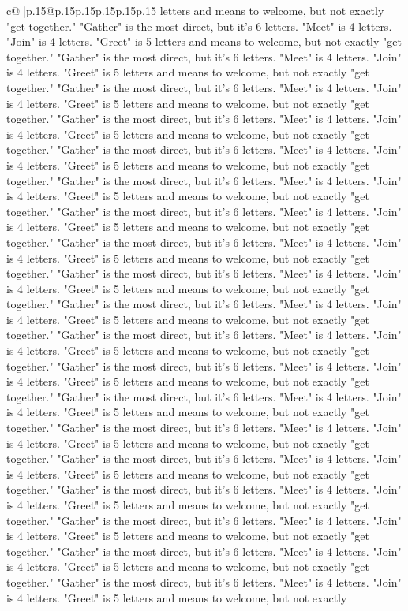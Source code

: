 \documentclass{article}
\begin{document}
{\begin{supertabular}{c@{$\;$}|p{.15\linewidth}@{}p{.15\linewidth}p{.15\linewidth}p{.15\linewidth}p{.15\linewidth}p{.15\linewidth}}
{{{letters and means to welcome, but not exactly "get together." "Gather" is the most direct, but it's 6 letters. "Meet" is 4 letters. "Join" is 4 letters. "Greet" is 5 letters and means to welcome, but not exactly "get together." "Gather" is the most direct, but it's 6 letters. "Meet" is 4 letters. "Join" is 4 letters. "Greet" is 5 letters and means to welcome, but not exactly "get together." "Gather" is the most direct, but it's 6 letters. "Meet" is 4 letters. "Join" is 4 letters. "Greet" is 5 letters and means to welcome, but not exactly "get together." "Gather" is the most direct, but it's 6 letters. "Meet" is 4 letters. "Join" is 4 letters. "Greet" is 5 letters and means to welcome, but not exactly "get together." "Gather" is the most direct, but it's 6 letters. "Meet" is 4 letters. "Join" is 4 letters. "Greet" is 5 letters and means to welcome, but not exactly "get together." "Gather" is the most direct, but it's 6 letters. "Meet" is 4 letters. "Join" is 4 letters. "Greet" is 5 letters and means to welcome, but not exactly "get together." "Gather" is the most direct, but it's 6 letters. "Meet" is 4 letters. "Join" is 4 letters. "Greet" is 5 letters and means to welcome, but not exactly "get together." "Gather" is the most direct, but it's 6 letters. "Meet" is 4 letters. "Join" is 4 letters. "Greet" is 5 letters and means to welcome, but not exactly "get together." "Gather" is the most direct, but it's 6 letters. "Meet" is 4 letters. "Join" is 4 letters. "Greet" is 5 letters and means to welcome, but not exactly "get together." "Gather" is the most direct, but it's 6 letters. "Meet" is 4 letters. "Join" is 4 letters. "Greet" is 5 letters and means to welcome, but not exactly "get together." "Gather" is the most direct, but it's 6 letters. "Meet" is 4 letters. "Join" is 4 letters. "Greet" is 5 letters and means to welcome, but not exactly "get together." "Gather" is the most direct, but it's 6 letters. "Meet" is 4 letters. "Join" is 4 letters. "Greet" is 5 letters and means to welcome, but not exactly "get together." "Gather" is the most direct, but it's 6 letters. "Meet" is 4 letters. "Join" is 4 letters. "Greet" is 5 letters and means to welcome, but not exactly "get together." "Gather" is the most direct, but it's 6 letters. "Meet" is 4 letters. "Join" is 4 letters. "Greet" is 5 letters and means to welcome, but not exactly "get together." "Gather" is the most direct, but it's 6 letters. "Meet" is 4 letters. "Join" is 4 letters. "Greet" is 5 letters and means to welcome, but not exactly "get together." "Gather" is the most direct, but it's 6 letters. "Meet" is 4 letters. "Join" is 4 letters. "Greet" is 5 letters and means to welcome, but not exactly "get together." "Gather" is the most direct, but it's 6 letters. "Meet" is 4 letters. "Join" is 4 letters. "Greet" is 5 letters and means to welcome, but not exactly "get together." "Gather" is the most direct, but it's 6 letters. "Meet" is 4 letters. "Join" is 4 letters. "Greet" is 5 letters and means to welcome, but not exactly "get together." "Gather" is the most direct, but it's 6 letters. "Meet" is 4 letters. "Join" is 4 letters. "Greet" is 5 letters and means to welcome, but not exactly }}}
\end{supertabular}}
\end{document}
